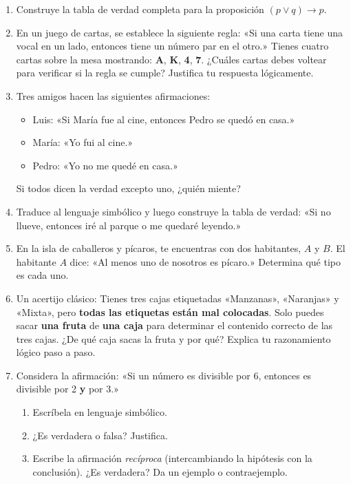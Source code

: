 \documentclass[12pt, a4paper]{article}
\begin{document}
\begin{enumerate}[leftmargin=*]
  \item \medio{} Construye la tabla de verdad completa para la proposición $(p \vee q) \rightarrow p$.

  \item \medio{} En un juego de cartas, se establece la siguiente regla: «Si una carta tiene una vocal en un lado, entonces tiene un número par en el otro.» Tienes cuatro cartas sobre la mesa mostrando: \textbf{A}, \textbf{K}, \textbf{4}, \textbf{7}. ¿Cuáles cartas debes voltear para verificar si la regla se cumple? Justifica tu respuesta lógicamente.

  \item \medio{} Tres amigos hacen las siguientes afirmaciones:
  \begin{itemize}
    \item Luis: «Si María fue al cine, entonces Pedro se quedó en casa.»
    \item María: «Yo fui al cine.»
    \item Pedro: «Yo no me quedé en casa.»
  \end{itemize}
  Si todos dicen la verdad excepto uno, ¿quién miente?

  \item \medio{} Traduce al lenguaje simbólico y luego construye la tabla de verdad: «Si no llueve, entonces iré al parque o me quedaré leyendo.»

  \item \dificil{} En la isla de caballeros y pícaros, te encuentras con dos habitantes, $A$ y $B$. El habitante $A$ dice: «Al menos uno de nosotros es pícaro.» Determina qué tipo es cada uno.

  \item \dificil{} Un acertijo clásico: Tienes tres cajas etiquetadas «Manzanas», «Naranjas» y «Mixta», pero \textbf{todas las etiquetas están mal colocadas}. Solo puedes sacar \textbf{una fruta} de \textbf{una caja} para determinar el contenido correcto de las tres cajas. ¿De qué caja sacas la fruta y por qué? Explica tu razonamiento lógico paso a paso.

  \item \dificil{} Considera la afirmación: «Si un número es divisible por 6, entonces es divisible por 2 \textbf{y} por 3.» 
  \begin{enumerate}[label=\alph*)]
    \item Escríbela en lenguaje simbólico.
    \item ¿Es verdadera o falsa? Justifica.
    \item Escribe la afirmación \emph{recíproca} (intercambiando la hipótesis con la conclusión). ¿Es verdadera? Da un ejemplo o contraejemplo.
  \end{enumerate}
\end{enumerate}
\end{document}
